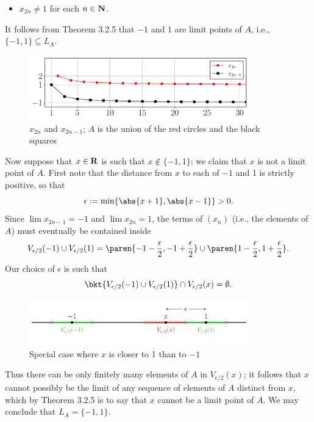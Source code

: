 \documentclass{lew98_solutions}
\begin{document}
\begin{solution}
\begin{enumerate}
\begin{itemize}
            \item \( x_{2n} \neq 1 \) for each \( n \in \mathbf{N} \).
        \end{itemize}
        It follows from Theorem 3.2.5 that \( -1 \) and \( 1 \) are limit points of \( A \), i.e., \( \{ -1, 1 \} \subseteq L_A \).
        \begin{figure}[H]
            \centering
            \includegraphics[width=0.85\textwidth]{UA_Figures/UA_ex3_2_2_fig_1.pdf}
            \caption{\( x_{2n} \) and \( x_{2n-1} \); \( A \) is the union of the red circles and the black squares}
            \label{fig:ex3.2.2_1}
        \end{figure}
        \noindent Now suppose that \( x \in \mathbf{R} \) is such that \( x \not\in \{ -1, 1 \} \); we claim that \( x \) is not a limit point of \( A \). First note that the distance from \( x \) to each of \( -1 \) and 1 is strictly positive, so that
        \[
            \epsilon := \min \{ \abs{x + 1}, \abs{x - 1} \} > 0.
        \]
        Since \( \lim x_{2n-1} = -1 \) and \( \lim x_{2n} = 1 \), the terms of \( (x_n) \) (i.e., the elements of \( A \)) must eventually be contained inside
        \[
            V_{\epsilon/2}(-1) \cup V_{\epsilon/2}(1) = \paren{ -1 - \frac{\epsilon}{2}, -1 + \frac{\epsilon}{2} } \cup \paren{ 1 - \frac{\epsilon}{2}, 1 + \frac{\epsilon}{2} }.
        \]
        Our choice of \( \epsilon \) is such that
        \[
            \bkt{ V_{\epsilon/2}(-1) \cup V_{\epsilon/2}(1) } \cap V_{\epsilon/2}(x) = \emptyset.
        \]
        \begin{figure}[H]
            \centering
            \includegraphics[width=0.85\textwidth]{UA_Figures/UA_ex3_2_2_fig_2.pdf}
            \caption{Special case where \( x \) is closer to 1 than to \( -1 \)}
            \label{fig:ex3.2.2_2}
        \end{figure}
        \noindent Thus there can be only finitely many elements of \( A \) in \( V_{\epsilon/2}(x) \); it follows that \( x \) cannot possibly be the limit of any sequence of elements of \( A \) distinct from \( x \), which by Theorem 3.2.5 is to say that \( x \) cannot be a limit point of \( A \). We may conclude that \( L_A = \{ -1, 1 \} \).


\end{enumerate}
\end{solution}
\end{document}

